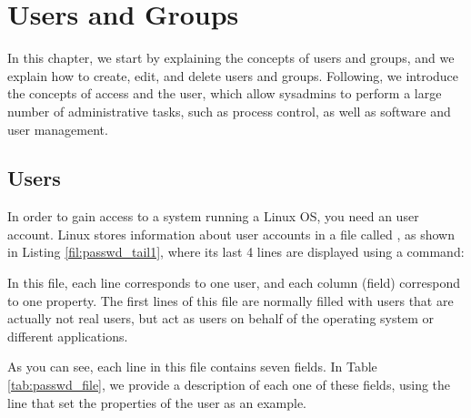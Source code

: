 \chapter{Users and Groups}\label{ch:users_groups}

In this chapter, we start by explaining the concepts of users and groups, and we explain how to create, edit, and delete users and groups. Following, we introduce the concepts of  access and the  user, which allow sysadmins to perform a large number of administrative tasks, such as process control, as well as software and user management. 

\section{Users}

In order to gain access to a system running a Linux \acs{OS}, you need an user account. Linux stores information about user accounts in a file called , as shown in Listing \ref{fil:passwd_tail1}, where its last 4 lines are displayed using a  command:
  

In this file, each line corresponds to one user, and each column (field) correspond to one property. The first lines of this file are normally filled with users that are actually not real users, but act as users on behalf of the operating system or different applications.

As you can see, each line in this file contains seven fields.  In Table \ref{tab:passwd_file}, we provide a description of each one of these fields, using the line that set the properties of the user  as an example.

